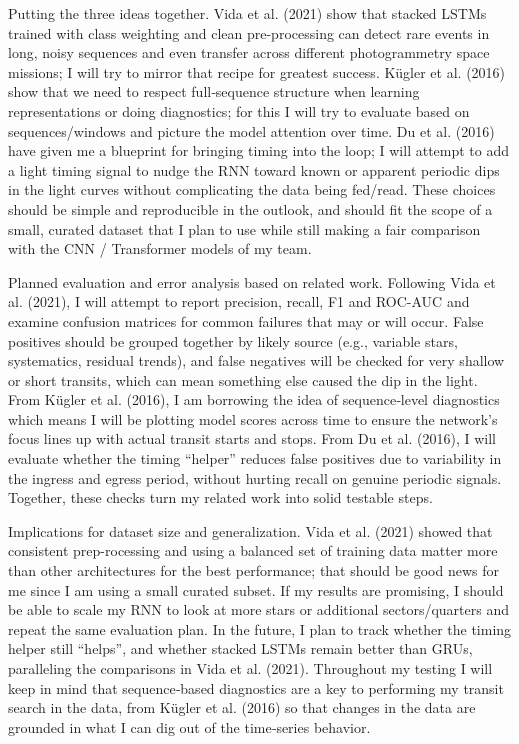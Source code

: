 \documentclass[letterpaper]{article}
\begin{document}
Putting the three ideas together. Vida et al. (2021) show that stacked LSTMs trained with class weighting and clean pre-processing can detect rare events in long, noisy sequences and even transfer across different photogrammetry space missions; I will try to mirror that recipe for greatest success. Kügler et al. (2016) show that we need to respect full‑sequence structure when learning representations or doing diagnostics; for this I will try to evaluate based on sequences/windows and picture the model attention over time. Du et al. (2016) have given me a blueprint for bringing timing into the loop; I will attempt to add a light timing signal to nudge the RNN toward known or apparent periodic dips in the light curves without complicating the data being fed/read. These choices should be simple and reproducible in the outlook, and should fit the scope of a small, curated dataset that I plan to use while still making a fair comparison with the CNN / Transformer models of my team.

Planned evaluation and error analysis based on related work. Following Vida et al. (2021), I will attempt to report precision, recall, F1 and ROC-AUC and examine confusion matrices for common failures that may or will occur. False positives should be grouped together by likely source (e.g., variable stars, systematics, residual trends), and false negatives will be checked for very shallow or short transits, which can mean something else caused the dip in the light. From Kügler et al. (2016), I am borrowing the idea of sequence‑level diagnostics which means I will be plotting model scores across time to ensure the network’s focus lines up with actual transit starts and stops. From Du et al. (2016), I will evaluate whether the timing “helper” reduces false positives due to variability in the ingress and egress period, without hurting recall on genuine periodic signals. Together, these checks turn my related work into solid testable steps.

Implications for dataset size and generalization. Vida et al. (2021) showed that consistent prep-rocessing and using a balanced set of training data matter more than other architectures for the best performance; that should be good news for me since I am using a small curated subset. If my results are promising, I should be able to scale my RNN to look at more stars or additional sectors/quarters and repeat the same evaluation plan. In the future, I plan to track whether the timing helper still “helps”, and whether stacked LSTMs remain better than GRUs, paralleling the comparisons in Vida et al. (2021). Throughout my testing I will keep in mind that sequence‑based diagnostics are a key to performing my transit search in the data, from Kügler et al. (2016) so that changes in the data are grounded in what I can dig out of the time‑series behavior.
\end{document}
